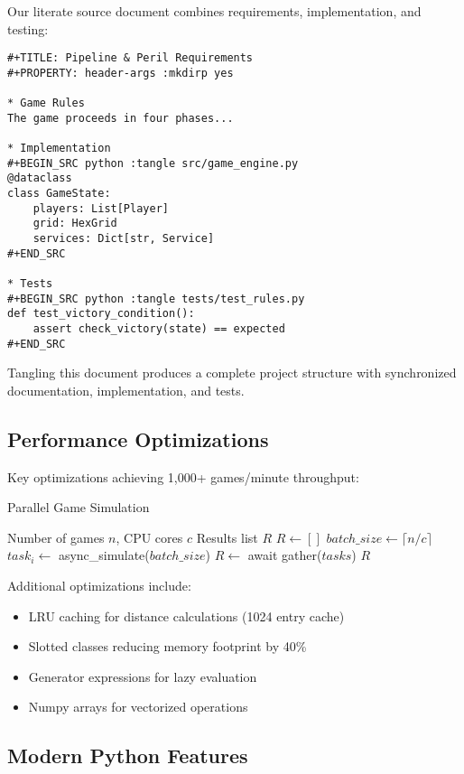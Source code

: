 \documentclass[sigconf]{acmart}
\begin{document}
Our literate source document combines requirements, implementation, and testing:

\begin{verbatim}
#+TITLE: Pipeline & Peril Requirements
#+PROPERTY: header-args :mkdirp yes

* Game Rules
The game proceeds in four phases...

* Implementation
#+BEGIN_SRC python :tangle src/game_engine.py
@dataclass
class GameState:
    players: List[Player]
    grid: HexGrid
    services: Dict[str, Service]
#+END_SRC

* Tests
#+BEGIN_SRC python :tangle tests/test_rules.py
def test_victory_condition():
    assert check_victory(state) == expected
#+END_SRC
\end{verbatim}

Tangling this document produces a complete project structure with synchronized documentation, implementation, and tests.

\subsection{Performance Optimizations}

Key optimizations achieving 1,000+ games/minute throughput:

\begin{algorithm}
\caption{Parallel Game Simulation}
\label{alg:parallel}
\begin{algorithmic}[1]
\REQUIRE Number of games $n$, CPU cores $c$
\ENSURE Results list $R$
\STATE $R \leftarrow []$
\STATE $batch\_size \leftarrow \lceil n / c \rceil$
  \STATE $task_i \leftarrow$ async\_simulate($batch\_size$)
\ENDFOR
\STATE $R \leftarrow$ await gather($tasks$)
\RETURN $R$
\end{algorithmic}
\end{algorithm}

Additional optimizations include:
\begin{itemize}
\item LRU caching for distance calculations (1024 entry cache)
\item Slotted classes reducing memory footprint by 40\%
\item Generator expressions for lazy evaluation
\item Numpy arrays for vectorized operations
\end{itemize}

\subsection{Modern Python Features}
\end{document}
